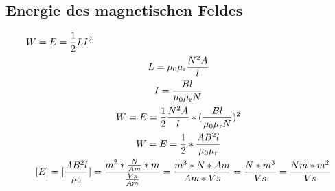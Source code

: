 \documentclass{scrartcl}
\begin{document}
        \subsection*{Energie des magnetischen Feldes}
            \begin{equation}
                \begin{multlined}
                    W = E = \frac{1}{2}LI^2 \\
                    L = \mu\textsubscript{0}\mu\textsubscript{r}\frac{N^2A}{l} \\
                    I = \frac{Bl}{\mu\textsubscript{0}\mu\textsubscript{r}N} \\
                    W = E = \frac{1}{2}\frac{N^2A}{l}*(\frac{Bl}{\mu\textsubscript{0}\mu\textsubscript{r}N})^2 \\
                    W = E = \frac{1}{2}*\frac{AB^2l}{\mu\textsubscript{0}\mu\textsubscript{r}} \\
                    [E] = [\frac{AB^2l}{\mu\textsubscript{0}}] = \frac{m^2*\frac{N}{Am}*m}{\frac{Vs}{Am}} = \frac{m^3*N*Am}{Am*Vs} = \frac{N*m^3}{Vs} = \frac{Nm*m^2}{Vs} 
                \end{multlined}
            \end{equation}
\end{document}
